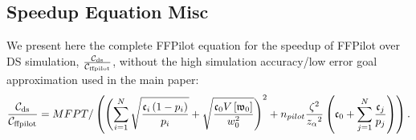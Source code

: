\continuesupplemental

\subsection{Speedup Equation Misc}
We present here the complete FFPilot equation for the speedup of FFPilot over DS simulation, $\frac{{\mathcal{C}}_{\textrm{ds}}}{{\mathcal{C}}_{\textrm{ffpilot}}}$, without the high simulation accuracy/low error goal approximation used in the main paper:
    \begin{equation*}
        \frac{{\mathcal{C}}_{\textrm{ds}}}{{\mathcal{C}}_{\textrm{ffpilot}}} = MFPT /\left( \left(\sum _{i=1}^N \sqrt{\frac{\mathfrak{c}_{i} \left( 1-p_{i} \right)}{p_{i}}}+\sqrt{\frac{\mathfrak{c}_{0} V \left[ \mathfrak{w}_{0} \right]}{w_0^2}}\right)^2 + n_{pilot} \frac{\zeta {}^2}{z_{\alpha} {}^2} \left( \mathfrak{c}_{0} + \sum _{j=1}^N \frac{\mathfrak{c}_{j}}{p_j} \right) \right).
	\end{equation*}

